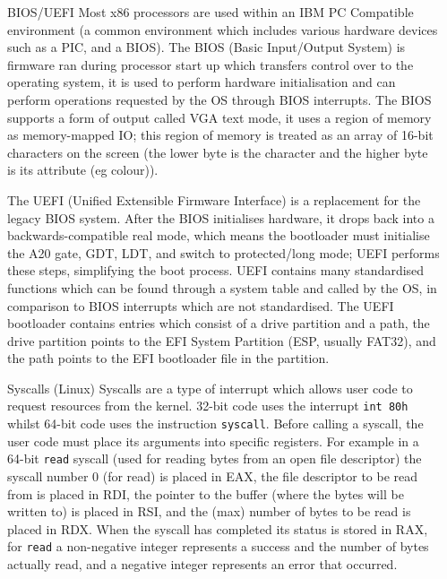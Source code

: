 \documentclass[final]{beamer}
\newlength{\sepwidth}
\newlength{\colwidth}
\newcommand{\separatorcolumn}{\begin{column}{\sepwidth}\end{column}}
\begin{document}
\begin{frame}[t]
\begin{columns}[t]
\separatorcolumn

\begin{column}{\colwidth}
  \begin{block}{BIOS/UEFI}
    Most x86 processors are used within an IBM PC Compatible environment (a common environment which includes various hardware devices such as a PIC, and a BIOS).
    The BIOS (Basic Input/Output System) is firmware ran during processor start up which transfers control over to the operating system, it is used to perform hardware initialisation and can perform operations requested by the OS through BIOS interrupts.
    The BIOS supports a form of output called VGA text mode, it uses a region of memory as memory-mapped IO;
    this region of memory is treated as an array of 16-bit characters on the screen (the lower byte is the character and the higher byte is its attribute (eg colour)).

    The UEFI (Unified Extensible Firmware Interface) is a replacement for the legacy BIOS system.
    After the BIOS initialises hardware, it drops back into a backwards-compatible real mode, which means the bootloader must initialise the A20 gate, GDT, LDT, and switch to protected/long mode;
    UEFI performs these steps, simplifying the boot process.
    UEFI contains many standardised functions which can be found through a system table and called by the OS, in comparison to BIOS interrupts which are not standardised.
    The UEFI bootloader contains entries which consist of a drive partition and a path, the drive partition points to the EFI System Partition (ESP, usually FAT32), and the path points to the EFI bootloader file in the partition.
  \end{block}

  \begin{block}{Syscalls (Linux)}
    Syscalls are a type of interrupt which allows user code to request resources from the kernel.
    32-bit code uses the interrupt \texttt{int 80h} whilst 64-bit code uses the instruction \texttt{syscall}.
    Before calling a syscall, the user code must place its arguments into specific registers.
    For example in a 64-bit \texttt{read} syscall (used for reading bytes from an open file descriptor) the syscall number 0 (for read) is placed in EAX, the file descriptor to be read from is placed in RDI, the pointer to the buffer (where the bytes will be written to) is placed in RSI, and the (max) number of bytes to be read is placed in RDX.
    When the syscall has completed its status is stored in RAX, for \texttt{read} a non-negative integer represents a success and the number of bytes actually read, and a negative integer represents an error that occurred.
  \end{block}


\end{column}
\end{columns}
\end{frame}
\end{document}
